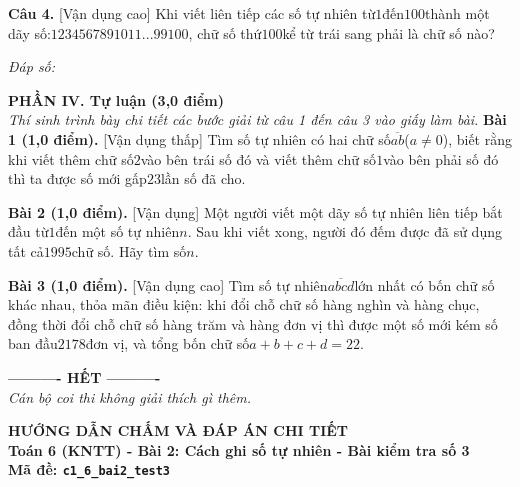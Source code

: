 \documentclass[11pt,a4paper]{article}
\begin{document}
\noindent\textbf{Câu 4.} [Vận dụng cao] Khi viết liên tiếp các số tự nhiên từ$1$đến$100$thành một dãy số:$1234567891011...99100$, chữ số thứ$100$kể từ trái sang phải là chữ số nào?\par\vspace{2pt}
\noindent\textit{Đáp số:} \dotfill\par\vspace{6pt}


\vspace{6pt}
\noindent
\textbf{\large PHẦN IV. Tự luận (3,0 điểm)}\\
\textit{\small Thí sinh trình bày chi tiết các bước giải từ câu 1 đến câu 3 vào giấy làm bài.}
\vspace{6pt}
\noindent\textbf{Bài 1 (1,0 điểm).} [Vận dụng thấp] Tìm số tự nhiên có hai chữ số$\overline{ab}$($a \ne 0$), biết rằng khi viết thêm chữ số$2$vào bên trái số đó và viết thêm chữ số$1$vào bên phải số đó thì ta được số mới gấp$23$lần số đã cho.\par\vspace{8pt}

\noindent\textbf{Bài 2 (1,0 điểm).} [Vận dụng] Một người viết một dãy số tự nhiên liên tiếp bắt đầu từ$1$đến một số tự nhiên$n$. Sau khi viết xong, người đó đếm được đã sử dụng tất cả$1995$chữ số. Hãy tìm số$n$.\par\vspace{8pt}

\noindent\textbf{Bài 3 (1,0 điểm).} [Vận dụng cao] Tìm số tự nhiên$\overline{abcd}$lớn nhất có bốn chữ số khác nhau, thỏa mãn điều kiện: khi đổi chỗ chữ số hàng nghìn và hàng chục, đồng thời đổi chỗ chữ số hàng trăm và hàng đơn vị thì được một số mới kém số ban đầu$2178$đơn vị, và tổng bốn chữ số$a + b + c + d = 22$.\par\vspace{8pt}


\begin{center}
\textbf{---------- HẾT ----------}\\
\textit{\small Cán bộ coi thi không giải thích gì thêm.}
\end{center}

\newpage
\begin{center}
{\Large\bfseries HƯỚNG DẪN CHẤM VÀ ĐÁP ÁN CHI TIẾT}\\[4pt]
{\large\bfseries Toán 6 (KNTT) - Bài 2: Cách ghi số tự nhiên - Bài kiểm tra số 3}\\[2pt]
{\bfseries Mã đề: \texttt{c1\_6\_bai2\_test3}}
\end{center}
\end{document}
